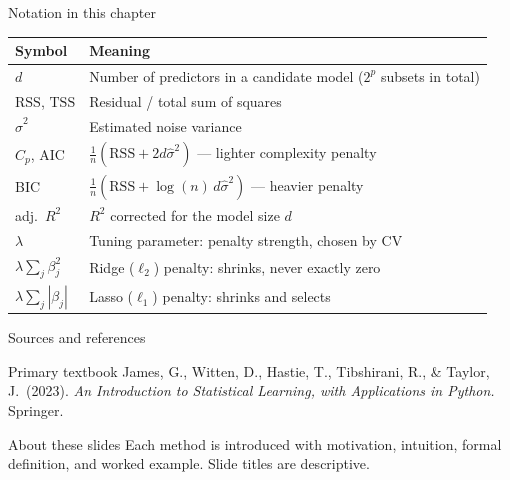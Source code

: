 \documentclass[aspectratio=169,11pt]{beamer}
\begin{document}
\begin{frame}{Notation in this chapter}
  \footnotesize
  \begin{center}
  \begin{tabular}{@{}ll@{}}
    \toprule
    \textbf{Symbol} & \textbf{Meaning} \\
    \midrule
    $d$ & Number of predictors in a candidate model ($2^p$ subsets in total) \\
    $\mathrm{RSS}$, $\mathrm{TSS}$ & Residual / total sum of squares \\
    $\hat\sigma^2$ & Estimated noise variance \\
    $C_p$, AIC & $\tfrac1n(\mathrm{RSS} + 2d\hat\sigma^2)$ --- lighter complexity penalty \\
    BIC & $\tfrac1n(\mathrm{RSS} + \log(n)\,d\hat\sigma^2)$ --- heavier penalty \\
    adj.\ $R^2$ & $R^2$ corrected for the model size $d$ \\
    $\lambda$ & Tuning parameter: penalty strength, chosen by CV \\
    $\lambda\sum_j \beta_j^2$ & Ridge ($\ell_2$) penalty: shrinks, never exactly zero \\
    $\lambda\sum_j |\beta_j|$ & Lasso ($\ell_1$) penalty: shrinks and selects \\
    \bottomrule
  \end{tabular}
  \end{center}
\end{frame}

\begin{frame}{Sources and references}
  \begin{block}{Primary textbook}
    James, G., Witten, D., Hastie, T., Tibshirani, R., \& Taylor, J.\ (2023).
    \emph{An Introduction to Statistical Learning, with Applications in
    Python.} Springer.
  \end{block}
  \begin{block}{About these slides}
    Each method is introduced with motivation, intuition, formal
    definition, and worked example. Slide titles are descriptive.
  \end{block}
\end{frame}
\end{document}
